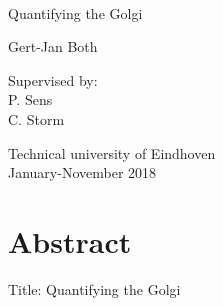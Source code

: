 \documentclass{Dissertate}
\date{}
\begin{document}
\begin{titlepage}
​    \begin{center}

        
        \vspace*{2.5cm}
        
        \huge
        Quantifying the Golgi
        
        \vspace{1.5cm}
        
        \Large
        Gert-Jan Both
    
        \vspace{1.5cm}
    
        
        \vfill
        
        \normalsize
        Supervised by:\\
        P. Sens\\
        C. Storm
    
        \vspace{0.8cm}
    
        
        \normalsize
        Technical university of Eindhoven\\
        January-November 2018
    
    
    \end{center}
\end{titlepage}

\hypertarget{abstract}{%
\chapter*{Abstract}\label{abstract}}

Title: Quantifying the Golgi
\end{document}
